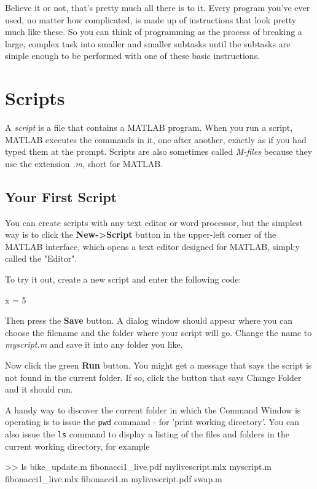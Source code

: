Believe it or not, that's pretty much all there is to it.  Every
program you've ever used, no matter how complicated, is made up of
instructions that look pretty much like these.  So you can think of
programming as the process of breaking a large, complex task
into smaller and smaller subtasks until the subtasks are
simple enough to be performed with one of these basic instructions.

\section{Scripts}

A \emph{script} is a file that contains a MATLAB program. When you run a script, MATLAB executes the commands in it, one after another, exactly as if you had typed them at the prompt. Scripts are
also sometimes called \emph{M-files} because they use the extension \emph{.m}, short for MATLAB.


\subsection{Your First Script}

You can create scripts with any text editor or word processor, but the simplest way is to click the \textbf{New->Script} button in the upper-left corner of the MATLAB interface, which opens a text editor designed for MATLAB, simpl;y called the "Editor".

To try it out, create a new script and enter the following code:

\begin{code}
x = 5
\end{code}

Then press the \textbf{Save} button.  A dialog window should appear where you can choose the filename and the folder where your script will go.
Change the name to \emph{myscript.m} and save it into any folder you like.

Now click the green \textbf{Run} button.  You might get a message that says the script is not found in the current folder.
If so, click the button that says Change Folder and it should run.  

A handy way to discover the current folder in which the Command Window is operating is to issue the \lstinline{pwd} command - for 'print working directory'.  You can also issue the \lstinline{ls} command to display a listing of the files and folders in the current working directory, for example
\begin{code}
  >> ls
bike_update.m	     fibonacci1_live.pdf  mylivescript.mlx  myscript.m
fibonacci1_live.mlx  fibonacci1.m	  mylivescript.pdf  swap.m
\end{code}

